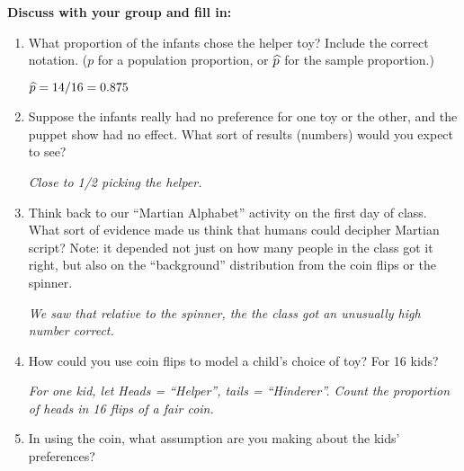{\bf Discuss with your group and fill in:	}\vspace{-.3cm}
\begin{enumerate}
  \item  What proportion of the infants chose the helper toy? Include
    the correct notation. ($p$ for a population proportion, or
    $\widehat{p}$ for the sample proportion.)
\begin{students}
     \vspace{1cm}
\end{students}

\begin{key}
     {\it  $\widehat{p} = 14/16 = 0.875$ }
\end{key}
\item  
     Suppose the infants really had no preference for one toy or the other,
     and the puppet show had no effect.  What sort of results
     (numbers) would     you expect to see?
\begin{students}
       \vspace{1cm}
\end{students}

\begin{key}
       {\it  Close to 1/2 picking the helper.}
\end{key}

   \item Think back to our ``Martian Alphabet'' activity on the first day of
     class.  What sort of evidence made us think that humans could
     decipher Martian script?  Note:  it depended not just on how many
     people in the class got it right, but also on 
     the ``background'' distribution from the coin flips or the spinner.
\begin{students}
  \vspace{2cm}
\end{students}

\begin{key}
       {\it   We saw that relative to the spinner, the the class got
         an unusually high number correct.}
\end{key}
 
   \item How could you use coin flips to model a child's choice of
     toy? For 16 kids?
\begin{students}
  \vspace{2cm}
\end{students}

\begin{key}
       {\it  For one kid, let Heads = ``Helper'', tails =
         ``Hinderer''.  Count the proportion of heads in 16 flips of a
         fair coin.} 
\end{key}
   \item In using the coin, what assumption are you making about the
     kids' preferences? 
\begin{students}
  \vspace*{2cm}
\end{students}


\end{enumerate}
